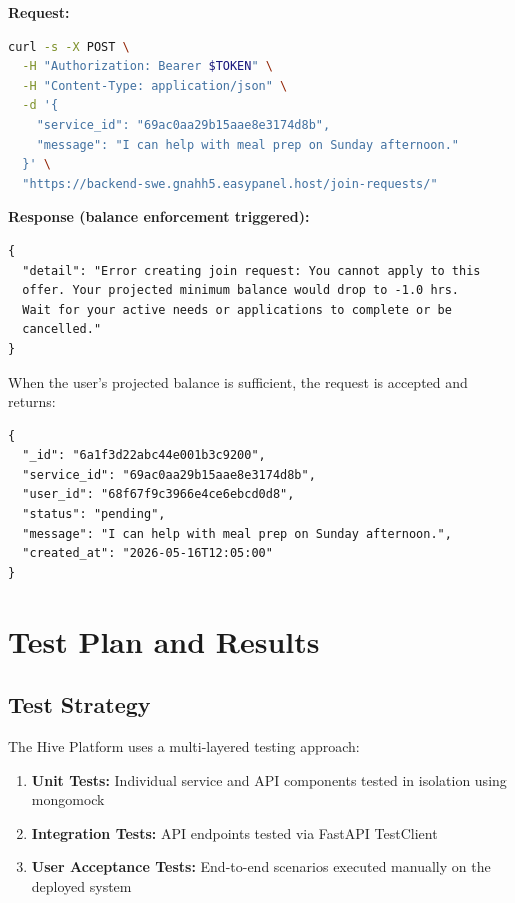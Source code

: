 \documentclass[11pt,a4paper]{report}
\begin{document}
\textbf{Request:}
\begin{lstlisting}[language=bash]
curl -s -X POST \
  -H "Authorization: Bearer $TOKEN" \
  -H "Content-Type: application/json" \
  -d '{
    "service_id": "69ac0aa29b15aae8e3174d8b",
    "message": "I can help with meal prep on Sunday afternoon."
  }' \
  "https://backend-swe.gnahh5.easypanel.host/join-requests/"
\end{lstlisting}

\textbf{Response (balance enforcement triggered):}
\begin{lstlisting}
{
  "detail": "Error creating join request: You cannot apply to this
  offer. Your projected minimum balance would drop to -1.0 hrs.
  Wait for your active needs or applications to complete or be
  cancelled."
}
\end{lstlisting}

When the user's projected balance is sufficient, the request is accepted and returns:
\begin{lstlisting}
{
  "_id": "6a1f3d22abc44e001b3c9200",
  "service_id": "69ac0aa29b15aae8e3174d8b",
  "user_id": "68f67f9c3966e4ce6ebcd0d8",
  "status": "pending",
  "message": "I can help with meal prep on Sunday afternoon.",
  "created_at": "2026-05-16T12:05:00"
}
\end{lstlisting}


\chapter{Test Plan and Results}
\label{chap:tests}

\section{Test Strategy}

The Hive Platform uses a multi-layered testing approach:

\begin{enumerate}
    \item \textbf{Unit Tests:} Individual service and API components tested in isolation using mongomock
    \item \textbf{Integration Tests:} API endpoints tested via FastAPI TestClient
    \item \textbf{User Acceptance Tests:} End-to-end scenarios executed manually on the deployed system
\end{enumerate}
\end{document}

